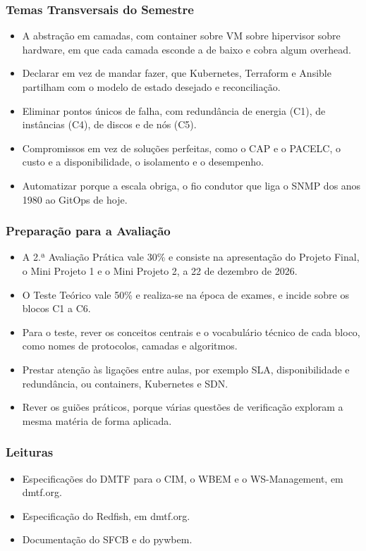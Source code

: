 \documentclass[aspectratio=169]{beamer}
\begin{document}
\begin{frame}
\frametitle{Temas Transversais do Semestre}
\begin{itemize}
    \setlength\itemsep{0.35cm}
    \item A abstração em camadas, com container sobre VM sobre hipervisor sobre hardware, em que cada camada esconde a de baixo e cobra algum overhead.
    \item Declarar em vez de mandar fazer, que Kubernetes, Terraform e Ansible partilham com o modelo de estado desejado e reconciliação.
    \item Eliminar pontos únicos de falha, com redundância de energia (C1), de instâncias (C4), de discos e de nós (C5).
    \item Compromissos em vez de soluções perfeitas, como o CAP e o PACELC, o custo e a disponibilidade, o isolamento e o desempenho.
    \item Automatizar porque a escala obriga, o fio condutor que liga o SNMP dos anos 1980 ao GitOps de hoje.
\end{itemize}
\end{frame}

\begin{frame}
\frametitle{Preparação para a Avaliação}
\begin{itemize}
    \setlength\itemsep{0.4cm}
    \item A 2.ª Avaliação Prática vale 30\% e consiste na apresentação do Projeto Final, o Mini Projeto 1 e o Mini Projeto 2, a 22 de dezembro de 2026.
    \item O Teste Teórico vale 50\% e realiza-se na época de exames, e incide sobre os blocos C1 a C6.
    \item Para o teste, rever os conceitos centrais e o vocabulário técnico de cada bloco, como nomes de protocolos, camadas e algoritmos.
    \item Prestar atenção às ligações entre aulas, por exemplo SLA, disponibilidade e redundância, ou containers, Kubernetes e SDN.
    \item Rever os guiões práticos, porque várias questões de verificação exploram a mesma matéria de forma aplicada.
\end{itemize}
\end{frame}

\begin{frame}
\frametitle{Leituras}
\begin{itemize}
    \setlength\itemsep{0.4cm}
    \item Especificações do DMTF para o CIM, o WBEM e o WS-Management, em dmtf.org.
    \item Especificação do Redfish, em dmtf.org.
    \item Documentação do SFCB e do pywbem.
\end{itemize}
\end{frame}
\end{document}
